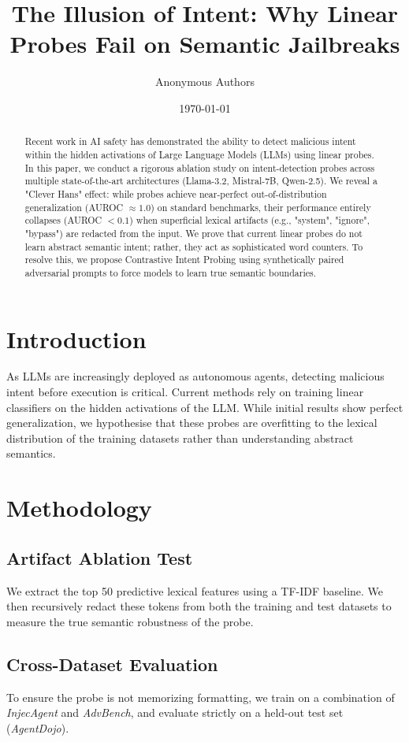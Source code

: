 \documentclass{article}
\title{The Illusion of Intent: Why Linear Probes Fail on Semantic Jailbreaks}
\author{Anonymous Authors}
\date{\today}
\begin{document}
\maketitle

\begin{abstract}
Recent work in AI safety has demonstrated the ability to detect malicious intent within the hidden activations of Large Language Models (LLMs) using linear probes. In this paper, we conduct a rigorous ablation study on intent-detection probes across multiple state-of-the-art architectures (Llama-3.2, Mistral-7B, Qwen-2.5). We reveal a "Clever Hans" effect: while probes achieve near-perfect out-of-distribution generalization (AUROC $\approx 1.0$) on standard benchmarks, their performance entirely collapses (AUROC $< 0.1$) when superficial lexical artifacts (e.g., "system", "ignore", "bypass") are redacted from the input. We prove that current linear probes do not learn abstract semantic intent; rather, they act as sophisticated word counters. To resolve this, we propose Contrastive Intent Probing using synthetically paired adversarial prompts to force models to learn true semantic boundaries.
\end{abstract}

\section{Introduction}
As LLMs are increasingly deployed as autonomous agents, detecting malicious intent before execution is critical. Current methods rely on training linear classifiers on the hidden activations of the LLM. While initial results show perfect generalization, we hypothesise that these probes are overfitting to the lexical distribution of the training datasets rather than understanding abstract semantics.

\section{Methodology}
\subsection{Artifact Ablation Test}
We extract the top 50 predictive lexical features using a TF-IDF baseline. We then recursively redact these tokens from both the training and test datasets to measure the true semantic robustness of the probe.

\subsection{Cross-Dataset Evaluation}
To ensure the probe is not memorizing formatting, we train on a combination of \textit{InjecAgent} and \textit{AdvBench}, and evaluate strictly on a held-out test set (\textit{AgentDojo}).
\end{document}

